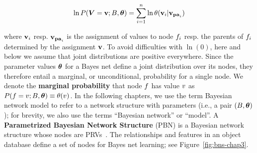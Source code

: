  	\begin{equation} \label{eq:bn}
 	\ln P(\boldsymbol{V} = \mathbf{v};B,\boldsymbol{\theta}) = \sum_{i=1}^{n} \ln \theta(\mathbf{v}_{i}|\mathbf{v}_{\mathbf{pa}_{i}})
 	\end{equation}
 	
 	where $\mathbf{v}_{i}$ resp. $\mathbf{v}_{\mathbf{pa}_{i}}$ is the assignment of values to node $f_{i}$ resp. the parents of $f_{i}$ determined by the assignment $\mathbf{v}$. 
 	To avoid difficulties with $\ln(0)$, here and below we assume that joint distributions are positive everywhere. Since the parameter values $\boldsymbol{\theta}$ for a Bayes net define a joint distribution over its nodes, they therefore entail a marginal, or unconditional, probability for a single node. We denote the \textbf{marginal probability} that node $f$ has value $v$ as $P(f = v;B,\boldsymbol{\theta}) \equiv \theta(v)$. In the following chapters, we use the term Bayesian network model to refer to a network structure with parameters (i.e., a pair $(B,\boldsymbol{\theta})$); for brevity, we also use the terms ``Bayesian network'' or ``model''. 
 					A \textbf{Parametrized Bayesian Network Structure} (PBN) is a Bayesian network structure  whose nodes are PRVs~\cite{Poole2003}.  				The relationships and features in an object database define a set of nodes for Bayes net learning; see Figure~\ref{fig:bns-chap3}.
